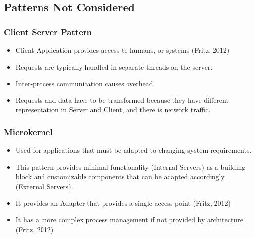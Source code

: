 \documentclass[a4paper,12pt]{article}
\begin{document}
\subsection{Patterns Not Considered}
\subsubsection{Client Server Pattern}

\begin{itemize}

\item Client Application provides access to humans, or systems (Fritz, 2012)
\item Requests are typically handled in separate threads on the server.
\item Inter-process communication causes overhead.
\item Requests and data have to be transformed because they have different representation in Server and Client, and there is network traffic.
\end{itemize}

\subsubsection{Microkernel}
\begin{itemize}
\item Used for applications that must be adapted to changing system requirements.
\item This pattern provides minimal functionality (Internal Servers) as a building block and customizable components that can be adapted accordingly (External Servers).
\item It provides an Adapter that provides a single access point (Fritz, 2012)
\item It has a more complex process management if not provided by architecture (Fritz, 2012)
\end{itemize}
\end{document}
